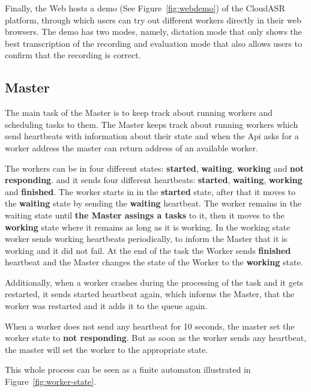 

Finally, the Web hosts a demo (See Figure~\ref{fig:webdemo}) of the CloudASR platform,
  through which users can try out different workers directly in their web browsers.
The demo has two modes, namely, dictation mode that only shows the best transcription of the recording
  and evaluation mode that also allows users to confirm that the recording is correct.


\subsection{Master}
The main task of the Master is to keep track about running workers and scheduling tasks to them.
The Master keeps track about running workers which send heartbeats with information about their state
  and when the Api asks for a worker address the master can return address of an available worker.

The workers can be in four different states:
  \textbf{started}, \textbf{waiting}, \textbf{working} and \textbf{not responding}.
  and it sends four different heartbeats:
  \textbf{started}, \textbf{waiting}, \textbf{working} and \textbf{finished}.
The worker starts in in the \textbf{started} state,
  after that it moves to the \textbf{waiting} state by sending the \textbf{waiting} heartbeat.
The worker remains in the waiting state until \textbf{the Master assings a tasks} to it,
  then it moves to the \textbf{working} state
  where it remains as long as it is working.
In the working state worker sends working heartbeats periodically,
  to inform the Master that it is working and it did not fail.
At the end of the task the Worker sends \textbf{finished} heartbeat
  and the Master changes the state of the Worker to the \textbf{working} state.

Additionally, when a worker crashes during the processing of the task and it gets restarted,
  it sends started heartbeat again,
  which informs the Master, that the worker was restarted and it adds it to the queue again.

When a worker does not send any heartbeat for 10 seconds,
  the master set the worker state to \textbf{not responding}.
But as soon as the worker sends any heartbeat,
  the master will set the worker to the appropriate state.

This whole process can be seen as a finite automaton illustrated in Figure~\ref{fig:worker-state}.

